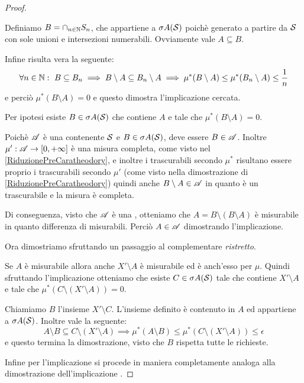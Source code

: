 \begin{proof}
\begin{description}
		Definiamo $B=\cap_{n\in\N}S_n$, che appartiene a $\sigma A(\S)$ poichè generato a partire da $\S$ con sole unioni e intersezioni numerabili. Ovviamente vale $A\subseteq B$.
		
		Infine risulta vera la seguente:
		\begin{equation*}
			\forall n\in\N:\ B\subseteq B_n\implies B\setminus A\subseteq B_n\setminus A\implies \mu^*(B\setminus A)\le \mu^*(B_n\setminus A)\le \frac1n
		\end{equation*}
		e perciò $\mu^*(B\setminus A)=0$ e questo dimostra l'implicazione cercata.
		\item[\ImplicationProof{SigmaDaFuoriEquivalenze}{MisurabileEquivalenze}] Per ipotesi esiste $B\in\sigma A(\S)$ che contiene $A$ e tale che $\mu^*(B\setminus A)=0$.
		
		Poichè $\A$ è una \sigalg{} contenente $\S$ e $B\in\sigma A(\S)$, deve essere $B\in\A$. 
		Inoltre $\mu':\A\to\Rpiu$ è una misura completa, come visto nel \cref{RiduzionePreCaratheodory}, e inoltre i trascurabili secondo $\mu^*$ risultano essere proprio i trascurabili secondo $\mu'$ (come visto nella dimostrazione di \cref{RiduzionePreCaratheodory}) quindi anche $B\setminus A\in \A$ in quanto è un trascurabile e la misura è completa. 
		
		Di conseguenza, visto che $\A$ è una \sigalg, otteniamo che $A=B\setminus (B\setminus A)$ è misurabile in quanto differenza di misurabili. Perciò $A\in\A$ dimostrando l'implicazione.
	\end{description}
	
	Ora dimostriamo  sfruttando un passaggio al complementare \emph{ristretto}.
	
	Se $A$ è misurabile allora anche $X'\setminus A$ è misurabile ed è anch'esso \sigfin[o] per $\mu$. Quindi sfruttando l'implicazione  otteniamo che esiste $C\in\sigma A(\S)$ tale che contiene $X'\setminus A$ e tale che $\mu^*(C\setminus(X'\setminus A))=0$. 
	
	Chiamiamo $B$ l'insieme $X'\setminus C$. L'insieme definito è contenuto in $A$ ed appartiene a $\sigma A(\S)$. Inoltre vale la seguente:
	\begin{equation*}
		A\setminus B\subseteq C\setminus (X'\setminus A) \implies \mu^*(A\setminus B)\le \mu^*\left(C\setminus(X'\setminus A)\right)\le \epsilon
	\end{equation*}
	e questo termina la dimostrazione, visto che $B$ rispetta tutte le richieste.
	
	Infine per l'implicazione  si procede in maniera completamente analoga alla dimostrazione dell'implicazione .
\end{proof}

